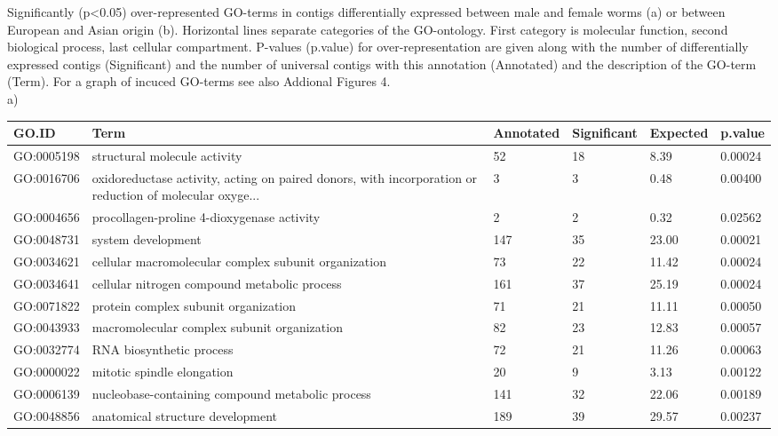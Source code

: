 \documentclass[10pt]{bmc_article}
\newenvironment{bmcformat}{\begin{raggedright}\baselineskip20pt\sloppy\setboolean{publ}{false}}{\end{raggedright}\baselineskip20pt\sloppy}
\begin{document}
\begin{bmcformat}
Significantly (p<0.05) over-represented GO-terms in contigs
differentially expressed between male and female worms (a) or between
European and Asian origin (b). Horizontal lines separate categories of
the GO-ontology. First category is molecular function, second
biological process, last cellular compartment. P-values (p.value) for
over-representation are given along with the number of differentially
expressed contigs (Significant) and the number of universal contigs
with this annotation (Annotated) and the description of the GO-term
(Term). For a graph of
incuced GO-terms see also Addional Figures 4.\\

a)\\

\begin{longtable}{lp{4.5cm}llll}
 GO.ID & Term & Annotated & Significant & Expected & p.value \\ 
  \hline
GO:0005198 & structural molecule activity &  52 &  18 & 8.39 & 0.00024 \\ 
  GO:0016706 & oxidoreductase activity, acting on paired donors, with incorporation or reduction of molecular oxyge... &   3 &   3 & 0.48 & 0.00400 \\ 
  GO:0004656 & procollagen-proline 4-dioxygenase activity &   2 &   2 & 0.32 & 0.02562 \\ 
   \hline
GO:0048731 & system development & 147 &  35 & 23.00 & 0.00021 \\ 
  GO:0034621 & cellular macromolecular complex subunit organization &  73 &  22 & 11.42 & 0.00024 \\ 
  GO:0034641 & cellular nitrogen compound metabolic process & 161 &  37 & 25.19 & 0.00024 \\ 
  GO:0071822 & protein complex subunit organization &  71 &  21 & 11.11 & 0.00050 \\ 
  GO:0043933 & macromolecular complex subunit organization &  82 &  23 & 12.83 & 0.00057 \\ 
  GO:0032774 & RNA biosynthetic process &  72 &  21 & 11.26 & 0.00063 \\ 
  GO:0000022 & mitotic spindle elongation &  20 &   9 & 3.13 & 0.00122 \\ 
  GO:0006139 & nucleobase-containing compound metabolic process & 141 &  32 & 22.06 & 0.00189 \\ 
  GO:0048856 & anatomical structure development & 189 &  39 & 29.57 & 0.00237 \\ 

\end{longtable}
\end{bmcformat}
\end{document}
